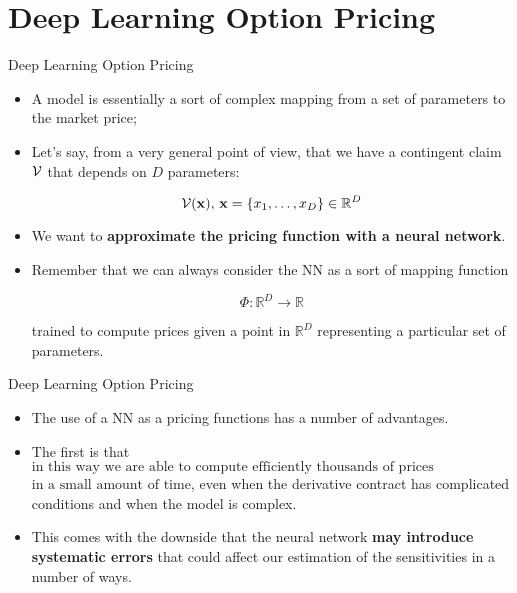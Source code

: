 \documentclass[11pt]{beamer}
\newcommand{\highlight}[1]{%
  \colorbox{yellow!50}{$\displaystyle#1$}}
\begin{document}
\section{Deep Learning Option Pricing}
\begin{frame}{Deep Learning Option Pricing}
	\begin{itemize}
		\item A model is essentially a sort of complex mapping from a set of parameters to the market price;
		\item Let's say, from a very general point of view, that we have a contingent claim $\cal{V}$ that depends on $D$ parameters:

$$
{\cal{V}}(\mathbf{x}), \, \mathbf{x}=\left\{x_1,\dots, x_D \right\} \in \mathbb{R}^D
$$

\item We want to \textbf{approximate the pricing function with a neural network}. 
\item Remember that we can always consider the NN as a sort of mapping function 

$$
\Phi : \mathbb{R}^D \rightarrow \mathbb{R}
$$

trained to compute prices given a point in $\mathbb{R}^D $ representing a particular set of parameters.  
	\end{itemize}
\end{frame}
\begin{frame}{Deep Learning Option Pricing}
	\begin{itemize}
		\item The use of a NN as a pricing functions has a number of advantages. 
		\item The first is that \highlight{\text{in this way we are able to compute efficiently thousands of prices}} \highlight{\text{in a small amount of time}}, even when the derivative contract has complicated conditions and when the model is complex. 
		\item This comes with the downside that the neural network \textbf{may introduce systematic errors} that could affect our estimation of the sensitivities in a number of ways. 

	\end{itemize}
\end{frame}
\end{document}
